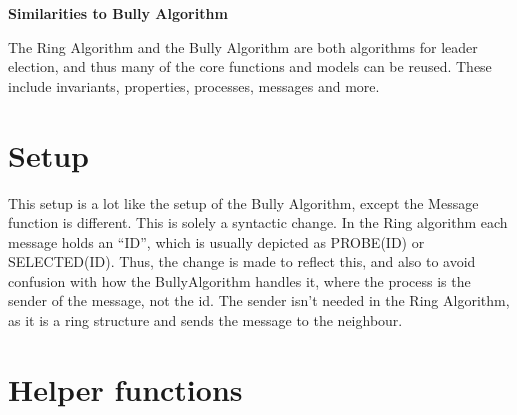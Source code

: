 \documentclass{report}
\begin{document}
\lipsum[1]

\textbf{Similarities to Bully Algorithm}

The Ring Algorithm and the Bully Algorithm are both algorithms for leader election, and thus many of the core functions and models can be reused. These include invariants, properties, processes, messages and more.

\section{Setup}
\noindent{}

This setup is a lot like the setup of the Bully Algorithm, except the Message function is different. This is solely a syntactic change. In the Ring algorithm each message holds an ``ID'', which is usually depicted as PROBE(ID) or SELECTED(ID). Thus, the change is made to reflect this, and also to avoid confusion with how the BullyAlgorithm handles it, where the process is the sender of the message, not the id. The sender isn't needed in the Ring Algorithm, as it is a ring structure and sends the message to the neighbour.

\section{Helper functions}
\noindent{}
\end{document}
